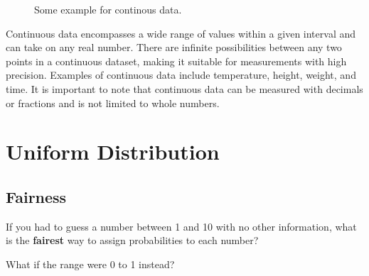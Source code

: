 \documentclass[
  a4paper,
]{scrbook}
\begin{document}
\begin{figure}[ht]


\caption{\label{fig-continousdata}Some example for continous data.}

\end{figure}%

Continuous data encompasses a wide range of values within a given
interval and can take on any real number. There are infinite
possibilities between any two points in a continuous dataset, making it
suitable for measurements with high precision. Examples of continuous
data include temperature, height, weight, and time. It is important to
note that continuous data can be measured with decimals or fractions and
is not limited to whole numbers.

\section{Uniform Distribution}\label{uniform-distribution}

\subsection{Fairness}\label{fairness}

If you had to guess a number between 1 and 10 with no other information,
what is the \textbf{fairest} way to assign probabilities to each number?

What if the range were 0 to 1 instead?
\end{document}
